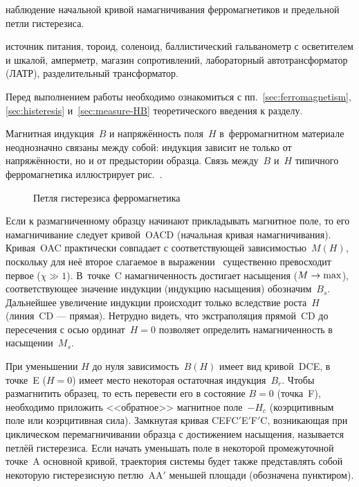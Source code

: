 \label{lab:4-4}

\begin{lab:aim}
	наблюдение начальной кривой намагничивания ферромагнетиков 
    и предельной петли гистерезиса.
\end{lab:aim}

\begin{lab:equipment}
	источник питания, тороид, соленоид, баллистический гальванометр с
осветителем и шкалой,
	амперметр, магазин сопротивлений, лабораторный автотрансформатор (ЛАТР),
разделительный трансформатор.
\end{lab:equipment}

Перед выполнением работы необходимо ознакомиться с
пп.~\ref{sec:ferromagnetism}, \ref{sec:histeresis} и~\ref{sec:measure-HB} 
теоретического введения к разделу.

Магнитная индукция~${B}$ и напряжённость поля~${H}$
в~ферромагнитном материале неоднозначно связаны между
собой: индукция зависит не только от напряжённости, но и от предыстории образца.
Связь между~$B$ и~$H$ типичного ферромагнетика иллюстрирует
рис.~.

\begin{figure}[h]
    \centering
    \caption{Петля гистерезиса ферромагнетика}
\end{figure}

Если к размагниченному образцу начинают прикладывать магнитное поле,
то его намагничивание следует кривой~OACD (начальная кривая намагничивания).
Кривая~OAC практически совпадает с соответствующей зависимостью~$M(H)$,
поскольку для неё второе слагаемое в выражении~
существенно превосходит первое ($\chi\gg1$). В~точке~C намагниченность
достигает насыщения ($M\to \rm max$), соответствующее значение
индукции (индукцию насыщения) обозначим~$B_s$.
Дальнейшее увеличение индукции происходит только вследствие
роста~$H$ (линия~CD --- прямая). Нетрудно видеть, что экстраполяция прямой~CD 
до пересечения с осью ординат~$H=0$ позволяет определить намагниченность 
в насыщении~$M_s$.

При уменьшении $H$ до нуля зависимость~$B(H)$ имеет вид
кривой~DCE, в точке~E ($H=0$) имеет место некоторая остаточная индукция~$B_r$.
Чтобы размагнитить образец, то есть перевести
его в состояние $B=0$ (точка~F), необходимо приложить <<обратное>> магнитное поле~$-H_c$
(коэрцитивным поле или коэрцитивная сила).
Замкнутая кривая CEFC$'$E$'$F$'$C, возникающая при циклическом перемагничивании
образца с достижением насыщения,
называется  петлёй гистерезиса. Если начать уменьшать поле
в некоторой промежуточной точке~A основной кривой, траектория
системы будет также представлять собой некоторую гистерезисную петлю~AA$'$
меньшей площади (обозначена пунктиром).


